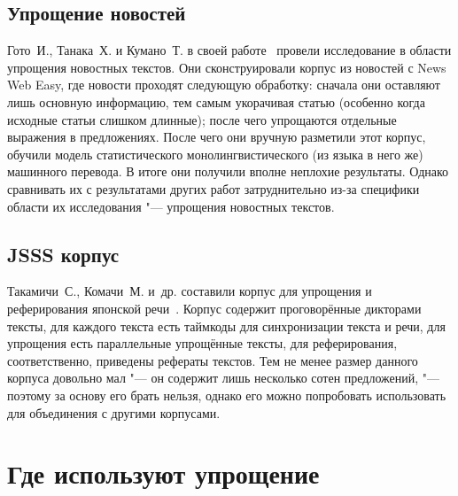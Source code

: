 \section{Упрощение новостей}


Гото~И., Танака~Х. и Кумано~Т. в своей работе~\cite{newsSimplification} провели исследование в области упрощения новостных текстов.
Они сконструировали корпус из новостей с News Web Easy, где новости проходят следующую обработку: сначала они оставляют лишь основную информацию, тем самым укорачивая статью (особенно когда исходные статьи слишком длинные); после чего упрощаются отдельные выражения в предложениях. После чего они вручную разметили этот корпус, обучили модель статистического монолингвистического (из языка в него же) машинного перевода. В итоге они получили вполне неплохие результаты. Однако сравнивать их с результатами других работ затруднительно из-за специфики области их исследования "--- упрощения новостных текстов.


\section{JSSS корпус}


Такамичи~С., Комачи~М. и~др. составили корпус для упрощения и реферирования японской речи~\cite{takamichi2020jsss}.
Корпус содержит проговорённые дикторами тексты, для каждого текста есть таймкоды для синхронизации текста и речи, для упрощения есть параллельные упрощённые тексты, для реферирования, соответственно, приведены рефераты текстов.
Тем не менее размер данного корпуса довольно мал "--- он содержит лишь несколько сотен предложений, "--- поэтому за основу его брать нельзя, однако его можно попробовать использовать для объединения с другими корпусами. 




\chapter{Где используют упрощение}\label{ch3}


